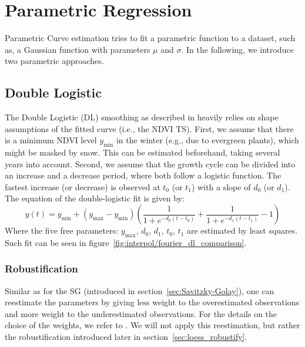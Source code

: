 
\section{Parametric Regression} 
	\label{sec:itpl_parametric}
	Parametric Curve estimation tries to fit a parametric function to a dataset, such as, a Gaussian function with parameters $\mu$ and $\sigma$. In the following, we introduce two parametric approaches.

	\subsection{Double Logistic}
		\label{sec:double_logistic}
		The Double Logistic (DL) smoothing as described in \cite{beckImprovedMonitoringVegetation2006} heavily relies on shape assumptions of the fitted curve (i.e., the NDVI {TS}). First, we assume that there  is a minimum NDVI level $y_{\min}$ in the winter (e.g., due to evergreen plants), which might be masked by snow. This can be estimated beforehand, taking several years into account. Second, we assume that the growth cycle can be divided into an increase and a decrease period, where both follow a logistic function. The fastest increase (or decrease) is observed at $t_0$ (or $t_1$) with a slope of $d_0$ (or $d_1$). The equation of the double-logistic fit is given by:
		\begin{equation*}
			y(t) = y_{\min} + \left(y_{\max}-y_{\min}\right)\left(\frac{1}{1+e^{-d_0(t-t_0)}}+\frac{1}{1+e^{-d_1(t-t_1)}}-1\right)
		\end{equation*}
		Where the five free parameters: $y_{\max}$, $d_0$, $d_1$, $t_0$, $t_1$ are estimated by least squares. Such fit can be seen in figure~\ref{fig:interpol/fourier_dl_comparison}.

		\subsubsection*{Robustification}
		Similar as for the SG (introduced in section~\ref{sec:Savitzky-Golay}), one can reestimate the parameters by giving less weight to the overestimated observations and more weight to the underestimated observations. For the details on the choice of the weights, we refer to \cite{beckImprovedMonitoringVegetation2006}. We will not apply this reestimation, but rather the robustification introduced later in section~\ref{sec:loess_robustify}.

